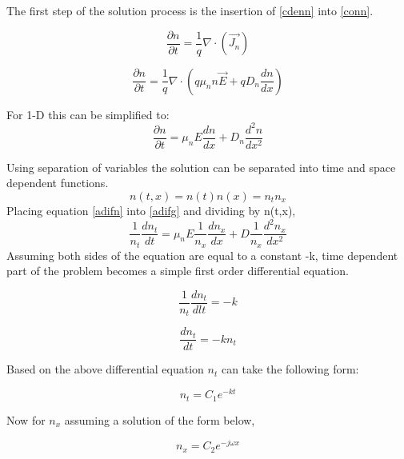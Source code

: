 \begin{doublespace}
The first step of the solution process is the insertion of \eqref{cdenn} into \eqref{conn}.

\begin{equation}
\frac{\partial n}{\partial t} = \frac{1}{q}\nabla \cdot (\vec{J_n})
\end{equation}


\begin{equation}
\frac{\partial n}{\partial t} = \frac{1}{q}\nabla \cdot (q \mu_{n} n \vec{E}+qD_{n} \frac{dn}{dx} )
\end{equation}

For 1-D this can be simplified to:
\begin{equation}
\frac{\partial n}{\partial t} = \mu_n E \frac{d n}{d x}+D_{n}\frac{d^{2}n}{dx^{2}}
\label{adifg}
\end{equation}

Using separation of variables the solution can be separated into time and space dependent functions\cite{NumModel}.
\begin{equation}
n(t,x)=n(t)n(x)=n_t n_x
\label{adifn}
\end{equation}
Placing equation \eqref{adifn} into \eqref{adifg} and dividing by n(t,x),
\begin{equation}
\frac{1}{n_{t}}\frac{d n_{t}}{d t}=\mu_n E \frac{1}{n_{x}}\frac{d n_{x}}{dx}+D\frac{1}{n_{x}}\frac{d^2 n_{x}}{dx^2}
\label{Adif}
\end{equation}
Assuming both sides of the equation are equal to a constant -k, time dependent part of the problem becomes a simple first order differential equation.

\begin{equation}
\nonumber
\frac{1}{n_{t}}\frac{d n_{t}}{dl t}=-k
\end{equation}

\begin{equation}
\nonumber
\frac{d n_{t}}{d t}=-kn_t
\end{equation}

Based on the above differential equation $n_t$ can take the following form:

\begin{equation}
n_t=C_1 e^{-kt}
\label{nt}
\end{equation}

Now for $n_x$ assuming a solution of the form below,

\begin{equation}
n_x=C_2 e^{-j\omega x}
\label{nx}
\end{equation}


\end{doublespace}
